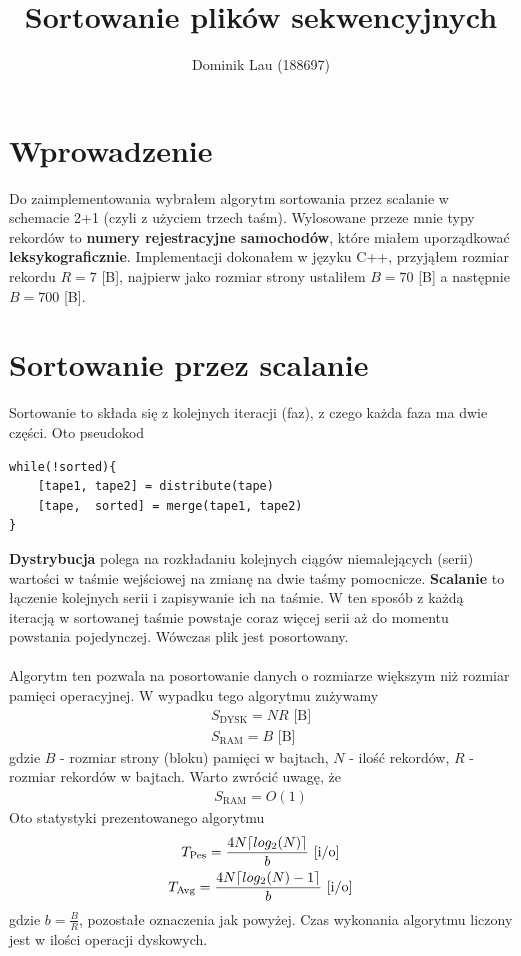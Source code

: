 \documentclass{article}
\title{Sortowanie plików sekwencyjnych}
\author{Dominik Lau (188697)}
\DeclarePairedDelimiter\ceil{\lceil}{\rceil}
\begin{document}
\maketitle

\section{Wprowadzenie}
Do zaimplementowania wybrałem algorytm sortowania przez scalanie w schemacie 2+1 (czyli z użyciem trzech taśm).  
Wylosowane przeze mnie typy rekordów to \textbf{numery rejestracyjne samochodów}, które miałem uporządkować \textbf{leksykograficznie}. Implementacji dokonałem w 
języku C++,  przyjąłem rozmiar rekordu $R=7$ [B], najpierw jako rozmiar strony ustaliłem  $B=70$ [B] a następnie
$B=700$ [B].
\section{Sortowanie przez scalanie}
Sortowanie to składa się z kolejnych iteracji (faz), z czego każda faza ma dwie części. Oto pseudokod
\begin{lstlisting}
while(!sorted){
	[tape1, tape2] = distribute(tape)
	[tape,  sorted] = merge(tape1, tape2)
}
\end{lstlisting}
\textbf{Dystrybucja} polega na rozkładaniu kolejnych ciągów niemalejących (serii) wartości w taśmie wejściowej 
na zmianę na dwie taśmy pomocnicze.  \textbf{Scalanie} to łączenie kolejnych serii i zapisywanie ich na taśmie. 
W ten sposób z każdą iteracją w sortowanej taśmie powstaje coraz więcej serii aż do momentu powstania pojedynczej. Wówczas plik jest posortowany. \\\\
Algorytm ten pozwala na posortowanie
danych o rozmiarze większym niż rozmiar pamięci operacyjnej. W wypadku tego algorytmu zużywamy 
\begin{gather*}
	S_{\text{DYSK}} = NR \text{  [B]}\\
	S_{\text{RAM}} = B \text{  [B]}
\end{gather*}
gdzie $B$ - rozmiar strony (bloku) pamięci w bajtach, $N$ - ilość rekordów, $R$ - rozmiar rekordów w bajtach. Warto zwrócić uwagę, że 
\begin{gather*}
	S_{\text{RAM}} = O(1)
\end{gather*}
Oto statystyki prezentowanego algorytmu
\begin{gather*}
	T_{\text{Pes}} = \frac{4N\ceil{log_2(N)}}{b} \text{  [i/o]}\\
	T_{\text{Avg}} = \frac{4N\ceil{log_2(N) - 1}}{b} \text{  [i/o]}
\end{gather*}
gdzie $b = \frac{B}{R}$, pozostałe oznaczenia jak powyżej.  Czas wykonania algorytmu liczony jest w ilości operacji
dyskowych.
\end{document}
